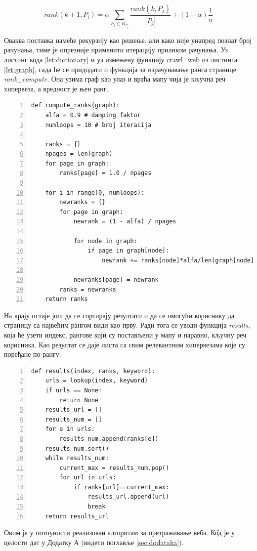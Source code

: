 \begin{equation}
rank(k+1, P_{i})=\alpha \sum_{P_{j} \in B_{P_{j}}}\frac{rank(k, P_{j})}{\left |P_{j}  \right |} + (1-\alpha)\frac{1}{n}
\end{equation}

Оваква поставка намеће рекурзију као решење, али како
није унапред познат број рачунања, тиме је опрезније применити итерацију
приликом рачунања. Уз листинг кода \ref{lst:dictionary} и уз измењену функцију
crawl\_web из листинга \ref{lst:graph}, сада ће се придодати и функција за
израчунавање ранга странице \emph{rank\_compute}. Она узима граф као улаз и враћа мапу чија је кључна реч хипервеза, а вредност је њен ранг.

\begin{lstlisting}[caption=Израчунавање ранга странице, label={lst:rank}, numbers=left]
def compute_ranks(graph):
    alfa = 0.9 # damping faktor
    numloops = 10 # broj iteracija

    ranks = {}
    npages = len(graph)
    for page in graph:
        ranks[page] = 1.0 / npages

    for i in range(0, numloops):
        newranks = {}
        for page in graph:
            newrank = (1 - alfa) / npages

            for node in graph:
                if page in graph[node]:
                    newrank += ranks[node]*alfa/len(graph[node])

            newranks[page] = newrank
        ranks = newranks
    return ranks
\end{lstlisting}

На крају остаје још да се сортирају резултати и да се омогући кориснику да страницу са највећим рангом види као прву. Ради тога се уводи функција \emph{results}, која ће узети индекс, рангове који су постављени у мапу и наравно, кључну реч корисника. Као резултат се даје листа са свим релевантним хипервезама које су поређане по рангу.

\begin{lstlisting}[caption=Функција која враћа најбољи резултат, label={lst:results}, numbers=left]
def results(index, ranks, keyword):
    urls = lookup(index, keyword)
    if urls == None:
        return None
    results_url = []
    results_num = []
    for e in urls:
        results_num.append(ranks[e])
    results_num.sort()
    while results_num:
        current_max = results_num.pop()
        for url in urls:
            if ranks[url]==current_max:
                results_url.append(url)
                break
    return results_url

\end{lstlisting}

Овим је у потпуности реализован алгоритам за претраживање веба. К\^{о}д је у целости дат у Додатку А (видети поглавље \ref{sec:dodataka}).
